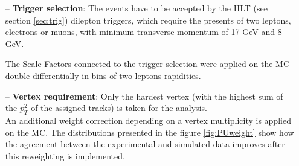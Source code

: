 \begin{itemize}
 \item [--] \textbf{Trigger selection}: The events have to be accepted by the HLT (see section \ref{sec:trig}) dilepton triggers, which require the presents of two leptons, electrons or muons, with
 minimum transverse momentum of 17 GeV and 8 GeV.
 
 The Scale Factors connected to the trigger selection were applied on the MC double-differentially in bins of two leptons rapidities. 
 \item [--] \textbf{Vertex requirement}: Only the hardest vertex (with the highest sum of the $p_{T}^{2}$ of the assigned tracks) is taken for the analysis. 
 \\
 An additional weight correction depending on a vertex multiplicity is applied on the MC. 
 The distributions presented in the figure \ref{fig:PUweight} show how the agreement
 between the experimental and simulated data improves after this reweighting is implemented.
 

\end{itemize}
